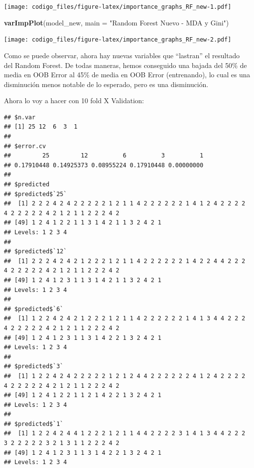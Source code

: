 \documentclass[]{article}
\newenvironment{Shaded}{\begin{snugshade}}{\end{snugshade}}
\newcommand{\KeywordTok}[1]{\textcolor[rgb]{0.13,0.29,0.53}{\textbf{#1}}}
\newcommand{\DataTypeTok}[1]{\textcolor[rgb]{0.13,0.29,0.53}{#1}}
\newcommand{\DecValTok}[1]{\textcolor[rgb]{0.00,0.00,0.81}{#1}}
\newcommand{\StringTok}[1]{\textcolor[rgb]{0.31,0.60,0.02}{#1}}
\newcommand{\OperatorTok}[1]{\textcolor[rgb]{0.81,0.36,0.00}{\textbf{#1}}}
\newcommand{\NormalTok}[1]{#1}
\begin{document}
\texttt{[image: codigo\_files/figure-latex/importance\_graphs\_RF\_new-1.pdf]}

\begin{Shaded}
\begin{Highlighting}[]
\KeywordTok{varImpPlot}\NormalTok{(model_new, }\DataTypeTok{main =} \StringTok{"Random Forest Nuevo - MDA y Gini"}\NormalTok{) }
\end{Highlighting}
\end{Shaded}

\texttt{[image: codigo\_files/figure-latex/importance\_graphs\_RF\_new-2.pdf]}

Como se puede observar, ahora hay nuevas variables que ``lastran'' el
resultado del Random Forest. De todas maneras, hemos conseguido una
bajada del 50\% de media en OOB Error al 45\% de media en OOB Error
(entrenando), lo cual es una disminución menos notable de lo esperado,
pero es una disminución.

Ahora lo voy a hacer con 10 fold X Validation:

\begin{Shaded}
\end{Shaded}

\begin{verbatim}
## $n.var
## [1] 25 12  6  3  1
## 
## $error.cv
##         25         12          6          3          1 
## 0.17910448 0.14925373 0.08955224 0.17910448 0.00000000 
## 
## $predicted
## $predicted$`25`
##  [1] 2 2 2 4 2 4 2 2 2 2 2 1 2 1 1 4 2 2 2 2 2 2 1 4 1 2 4 2 2 2 2 4 2 2 2 2 2 4 2 1 2 1 1 2 2 2 4 2
## [49] 1 2 4 1 2 2 1 1 3 1 4 2 1 1 3 2 4 2 1
## Levels: 1 2 3 4
## 
## $predicted$`12`
##  [1] 2 2 2 4 2 4 2 1 2 2 2 1 2 1 1 4 2 2 2 2 2 2 1 4 2 2 4 4 2 2 2 4 2 2 2 2 2 4 2 1 2 1 1 2 2 2 4 2
## [49] 1 2 4 1 2 3 1 1 3 1 4 2 1 1 3 2 4 2 1
## Levels: 1 2 3 4
## 
## $predicted$`6`
##  [1] 1 2 2 4 2 4 2 1 2 2 2 1 2 1 1 4 2 2 2 2 2 2 1 4 1 3 4 4 2 2 2 4 2 2 2 2 2 4 2 1 2 1 1 2 2 2 4 2
## [49] 1 2 4 1 2 3 1 1 3 1 4 2 2 1 3 2 4 2 1
## Levels: 1 2 3 4
## 
## $predicted$`3`
##  [1] 1 2 2 4 2 4 2 2 2 2 2 1 2 1 2 4 4 2 2 2 2 2 2 4 1 2 4 2 2 2 2 4 2 2 2 2 2 4 2 1 2 1 1 2 2 2 4 2
## [49] 1 2 4 1 2 2 1 1 2 1 4 2 2 1 3 2 4 2 1
## Levels: 1 2 3 4
## 
## $predicted$`1`
##  [1] 1 2 2 4 2 4 4 1 2 2 2 1 2 1 1 4 4 2 2 2 2 3 1 4 1 3 4 4 2 2 2 3 2 2 2 2 2 3 2 1 3 1 1 2 2 2 4 2
## [49] 1 2 4 1 2 3 1 1 3 1 4 2 2 1 3 2 4 2 1
## Levels: 1 2 3 4
\end{verbatim}
\end{document}

